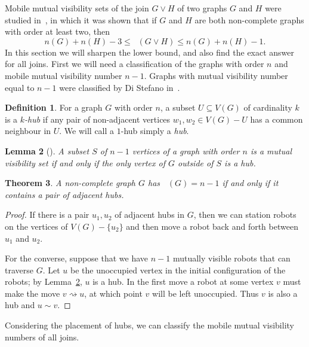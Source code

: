 \documentclass[a4paper,12pt]{article}
\DeclareMathOperator{\mobmv}{Mob_{\mu}}
\newtheorem{theorem}{Theorem}[section]
\newtheorem{lemma}[theorem]{Lemma}
\theoremstyle{definition}
\newtheorem{definition}[theorem]{Definition}
\newcommand{\move}{\rightsquigarrow}
\begin{document}
	Mobile mutual visibility sets of the join $G \vee H$ of two graphs $G$ and $H$ were studied in~\cite{dettlaff2024}, in which it was shown that if $G$ and $H$ are both non-complete graphs with order at least two, then \[ n (G)+ n(H)-3 \leq \mobmv (G \vee H) \leq n(G)+n(H)-1.\] In this section we will sharpen the lower bound, and also find the exact answer for all joins. First we will need a classification of the graphs with order $n$ and mobile mutual visibility number $n-1$. Graphs with mutual visibility number equal to $n-1$ were classified by Di Stefano in~\cite{DiStefano}.
	
	\begin{definition}
		For a graph $G$ with order $n$, a subset $U \subseteq V(G)$ of cardinality $k$ is a \emph{$k$-hub} if any pair of non-adjacent vertices $w_1,w_2 \in V(G)-U$ has a common neighbour in $U$. We will call a $1$-hub simply a \emph{hub}.
	\end{definition}
	
	\begin{lemma}[\cite{DiStefano}]\label{lem:hub}
		A subset $S$ of $n-1$ vertices of a graph with order $n$ is a mutual visibility set if and only if the only vertex of $G$ outside of $S$ is a hub.
	\end{lemma}
	
	\begin{theorem}\label{thm:mobmv=n-1}
		A non-complete graph $G$ has $\mobmv (G) = n-1$ if and only if it contains a pair of adjacent hubs.
	\end{theorem}
	\begin{proof}
		If there is a pair $u_1,u_2$ of adjacent hubs in $G$, then we can station robots on the vertices of $V(G)-\{ u_2\} $ and then move a robot back and forth between $u_1$ and $u_2$.
		
		For the converse, suppose that we have $n-1$ mutually visible robots that can traverse $G$. Let $u$ be the unoccupied vertex in the initial configuration of the robots; by Lemma~\ref{lem:hub}, $u$ is a hub. In the first move a robot at some vertex $v$ must make the move $v \move u$, at which point $v$ will be left unoccupied. Thus $v$ is also a hub and $u \sim v$. 
	\end{proof}
	
	Considering the placement of hubs, we can classify the mobile mutual visibility numbers of all joins.
	
\end{document}
